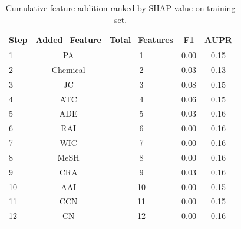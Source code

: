 \begin{table}[htbp]
\centering
\caption{Cumulative feature addition ranked by SHAP value on training set.}
\label{tab:shap_cumulative}
\begin{tabular}{lcccc}
\toprule
Step & Added\_Feature & Total\_Features & F1 & AUPR \\
\midrule
1 & PA & 1 & 0.00 & 0.15 \\
2 & Chemical & 2 & 0.03 & 0.13 \\
3 & JC & 3 & 0.08 & 0.15 \\
4 & ATC & 4 & 0.06 & 0.15 \\
5 & ADE & 5 & 0.03 & 0.16 \\
6 & RAI & 6 & 0.00 & 0.16 \\
7 & WIC & 7 & 0.00 & 0.16 \\
8 & MeSH & 8 & 0.00 & 0.16 \\
9 & CRA & 9 & 0.03 & 0.16 \\
10 & AAI & 10 & 0.00 & 0.15 \\
11 & CCN & 11 & 0.00 & 0.15 \\
12 & CN & 12 & 0.00 & 0.16 \\
\bottomrule
\end{tabular}
\end{table}